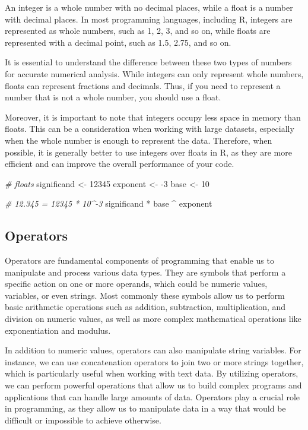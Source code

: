 \documentclass[
]{book}
\newenvironment{Shaded}{\begin{snugshade}}{\end{snugshade}}
\newcommand{\CommentTok}[1]{\textcolor[rgb]{0.56,0.35,0.01}{\textit{#1}}}
\newcommand{\DecValTok}[1]{\textcolor[rgb]{0.00,0.00,0.81}{#1}}
\newcommand{\NormalTok}[1]{#1}
\newcommand{\OtherTok}[1]{\textcolor[rgb]{0.56,0.35,0.01}{#1}}
\newcommand{\SpecialCharTok}[1]{\textcolor[rgb]{0.00,0.00,0.00}{#1}}
\begin{document}
An integer is a whole number with no decimal places, while a float is a number with decimal places. In most programming languages, including R, integers are represented as whole numbers, such as 1, 2, 3, and so on, while floats are represented with a decimal point, such as 1.5, 2.75, and so on.

It is essential to understand the difference between these two types of numbers for accurate numerical analysis. While integers can only represent whole numbers, floats can represent fractions and decimals. Thus, if you need to represent a number that is not a whole number, you should use a float.

Moreover, it is important to note that integers occupy less space in memory than floats. This can be a consideration when working with large datasets, especially when the whole number is enough to represent the data. Therefore, when possible, it is generally better to use integers over floats in R, as they are more efficient and can improve the overall performance of your code.

\begin{Shaded}
\begin{Highlighting}[]
\CommentTok{\# floats}
\NormalTok{significand }\OtherTok{\textless{}{-}} \DecValTok{12345}
\NormalTok{exponent }\OtherTok{\textless{}{-}} \SpecialCharTok{{-}}\DecValTok{3}
\NormalTok{base }\OtherTok{\textless{}{-}} \DecValTok{10}

\CommentTok{\# 12.345 = 12345 * 10\^{}{-}3}
\NormalTok{significand }\SpecialCharTok{*}\NormalTok{ base }\SpecialCharTok{\^{}}\NormalTok{ exponent}
\end{Highlighting}
\end{Shaded}

\hypertarget{operators}{%
\subsection{Operators}\label{operators}}

Operators are fundamental components of programming that enable us to manipulate and process various data types. They are symbols that perform a specific action on one or more operands, which could be numeric values, variables, or even strings. Most commonly these symbols allow us to perform basic arithmetic operations such as addition, subtraction, multiplication, and division on numeric values, as well as more complex mathematical operations like exponentiation and modulus.

In addition to numeric values, operators can also manipulate string variables. For instance, we can use concatenation operators to join two or more strings together, which is particularly useful when working with text data. By utilizing operators, we can perform powerful operations that allow us to build complex programs and applications that can handle large amounts of data. Operators play a crucial role in programming, as they allow us to manipulate data in a way that would be difficult or impossible to achieve otherwise.
\end{document}
